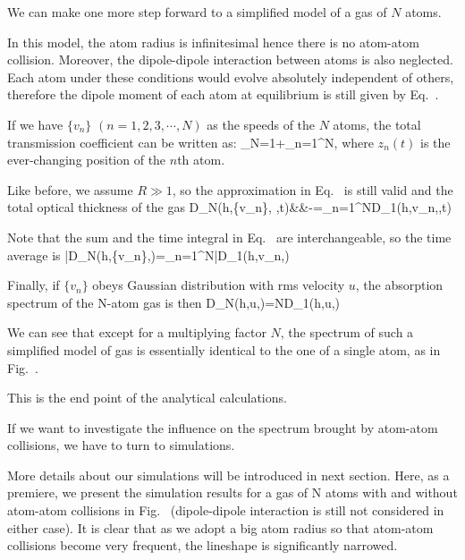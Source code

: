 We can make one more step forward to a simplified model of a gas of $N$ atoms.

In this model, the atom radius is infinitesimal hence there is no atom-atom collision. Moreover, the dipole-dipole interaction between atoms is also neglected. Each atom under these conditions would evolve absolutely independent of others, therefore the dipole moment of each atom at equilibrium is still given by Eq.~. 

If we have $\{v_n\}$ $(n=1,2,3,\cdots,N)$ as the speeds of the $N$ atoms, the total transmission coefficient can be written as:
\bea
\tau_N=1+\sum_{n=1}^{N},
\eea
where $z_n(t)$ is the ever-changing position of the $n$th atom. 

Like before, we assume $R\gg 1$, so the approximation in Eq.~ is still valid and the total optical thickness of the gas
\bea
D_N(h,\{v_n\}, \delta,t)&\approx&-\left[\sum_{n=1}^{N}ie^{-iz_n(t)}d(h,\delta,v_n,t)\right]=\sum_{n=1}^{N}D_1(h,v_n,\delta,t)
\eea

Note that the sum and the time integral in Eq.~ are interchangeable, so the time average is
\bea
\bar{D}_N(h,\{v_n\},\delta)=\sum_{n=1}^{N}\bar{D}_1(h,v_n,\delta)
\eea

Finally, if $\{v_n\}$ obeys Gaussian distribution with rms velocity $u$, the absorption spectrum of the N-atom gas is then
\bea
D_N(h,u,\delta)=ND_1(h,u,\delta)
\eea

We can see that except for a multiplying factor $N$, the spectrum of such a simplified model of gas is essentially identical to the one of a single atom, as in Fig.~. 
 
This is the end point of the analytical calculations. 

If we want to investigate the influence on the spectrum brought by atom-atom collisions, we have to turn to simulations.

More details about our simulations will be introduced in next section. Here, as a premiere, we present the simulation results for a gas of N atoms with and without atom-atom collisions in Fig.~ (dipole-dipole interaction is still not considered in either case). It is clear that as we adopt a big atom radius so that atom-atom collisions become very frequent, the lineshape is significantly narrowed. 

